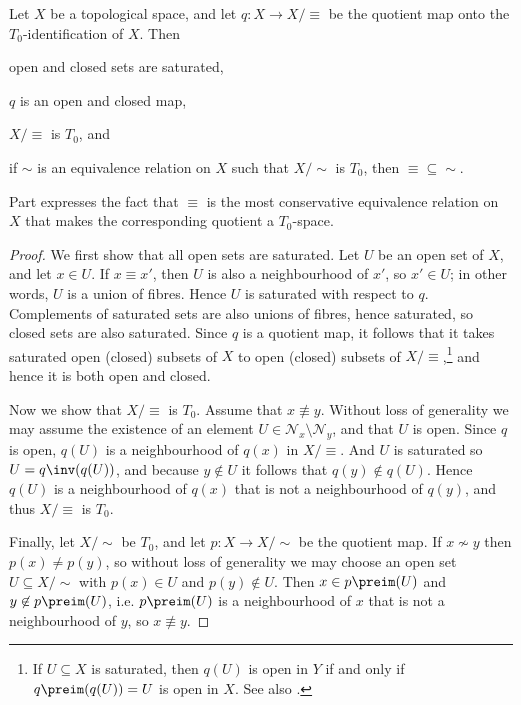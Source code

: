 \documentclass[article, a4paper, 11pt, oneside]{memoir}
\numberwithin{equation}{chapter}
\newcommand{\calN}{\mathcal{N}}
\newcommand{\nhoodfilter}[1]{\calN_{#1}}
\begin{document}
\begin{theorem}
    Let $X$ be a topological space, and let $q \colon X \to X/{\equiv}$ be the quotient map onto the $T_0$-identification of $X$. Then
    \begin{enumthm}
        \item \label{enum:T0-identification-saturated} open and closed sets are saturated,
        \item \label{enum:T0-quotient-map-open-closed} $q$ is an open and closed map,
        \item $X/{\equiv}$ is $T_0$, and
        \item \label{enum:T0-identification-is-smallest-equiv} if $\sim$ is an equivalence relation on $X$ such that $X/{\sim}$ is $T_0$, then ${\equiv} \subseteq {\sim}$.\footnotemark
    \end{enumthm}
\end{theorem}
%
Part  expresses the fact that $\equiv$ is the most conservative equivalence relation on $X$ that makes the corresponding quotient a $T_0$-space.

\begin{proof}
    We first show that all open sets are saturated. Let $U$ be an open set of $X$, and let $x \in U$. If $x \equiv x'$, then $U$ is also a neighbourhood of $x'$, so $x' \in U$; in other words, $U$ is a union of fibres. Hence $U$ is saturated with respect to $q$. Complements of saturated sets are also unions of fibres, hence saturated, so closed sets are also saturated. Since $q$ is a quotient map, it follows that it takes saturated open (closed) subsets of $X$ to open (closed) subsets of $X/{\equiv}$,\footnote{If $U \subseteq X$ is saturated, then $q(U)$ is open in $Y$ if and only if $q\preim(q(U)) = U$ is open in $X$. See also \textcite[Proposition~3.60]{leetopological}.} and hence it is both open and closed.

    Now we show that $X/{\equiv}$ is $T_0$. Assume that $x \not\equiv y$. Without loss of generality we may assume the existence of an element $U \in \nhoodfilter{x} \setminus \nhoodfilter{y}$, and that $U$ is open. Since $q$ is open, $q(U)$ is a neighbourhood of $q(x)$ in $X/{\equiv}$. And $U$ is saturated so $U = q\inv(q(U))$, and because $y \not\in U$ it follows that $q(y) \not\in q(U)$. Hence $q(U)$ is a neighbourhood of $q(x)$ that is not a neighbourhood of $q(y)$, and thus $X/{\equiv}$ is $T_0$.

    Finally, let $X/{\sim}$ be $T_0$, and let $p \colon X \to X/{\sim}$ be the quotient map. If $x \not\sim y$ then $p(x) \neq p(y)$, so without loss of generality we may choose an open set $U \subseteq X/{\sim}$ with $p(x) \in U$ and $p(y) \not\in U$. Then $x \in p\preim(U)$ and $y \not\in p\preim(U)$, i.e. $p\preim(U)$ is a neighbourhood of $x$ that is not a neighbourhood of $y$, so $x \not\equiv y$.
\end{proof}
\end{document}
